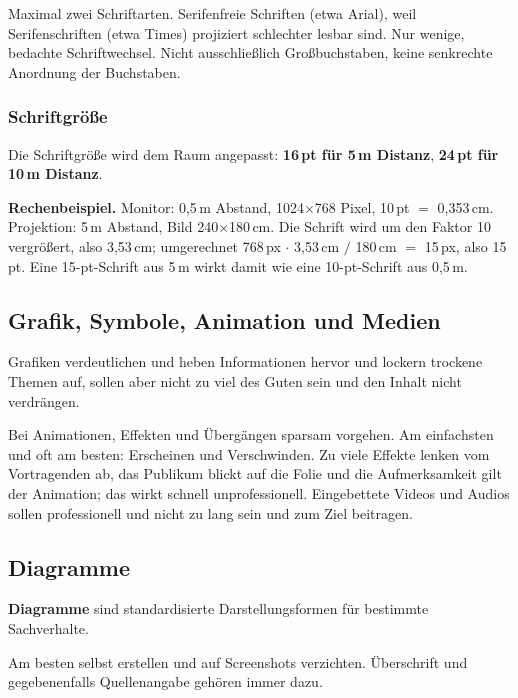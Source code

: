 \documentclass[12pt, a4paper]{article}
\begin{document}
Maximal zwei Schriftarten. Serifenfreie Schriften (etwa Arial), weil
Serifenschriften (etwa Times) projiziert schlechter lesbar sind. Nur wenige,
bedachte Schriftwechsel. Nicht ausschließlich Großbuchstaben, keine
senkrechte Anordnung der Buchstaben.

\subsubsection{Schriftgröße}

Die Schriftgröße wird dem Raum angepasst: \textbf{16\,pt für 5\,m Distanz},
\textbf{24\,pt für 10\,m Distanz}.

\begin{examplebox}
\textbf{Rechenbeispiel.} Monitor: 0,5\,m Abstand, 1024$\times$768 Pixel,
10\,pt $=$ 0,353\,cm. Projektion: 5\,m Abstand, Bild 240$\times$180\,cm. Die
Schrift wird um den Faktor 10 vergrößert, also 3,53\,cm; umgerechnet
768\,px $\cdot$ 3{,}53\,cm $/$ 180\,cm $=$ 15\,px, also 15\,pt. Eine
15-pt-Schrift aus 5\,m wirkt damit wie eine 10-pt-Schrift aus 0,5\,m.
\end{examplebox}

\subsection{Grafik, Symbole, Animation und Medien}

Grafiken verdeutlichen und heben Informationen hervor und lockern trockene
Themen auf, sollen aber nicht \glqq zu viel des Guten\grqq{} sein und den
Inhalt nicht verdrängen.

Bei Animationen, Effekten und Übergängen sparsam vorgehen. Am einfachsten und
oft am besten: Erscheinen und Verschwinden. Zu viele Effekte lenken vom
Vortragenden ab, das Publikum blickt auf die Folie und die Aufmerksamkeit
gilt der Animation; das wirkt schnell unprofessionell. Eingebettete Videos
und Audios sollen professionell und nicht zu lang sein und zum Ziel
beitragen.

\subsection{Diagramme}

\begin{definitionbox}
\textbf{Diagramme} sind standardisierte Darstellungsformen für bestimmte
Sachverhalte.
\end{definitionbox}

Am besten selbst erstellen und auf Screenshots verzichten. Überschrift und
gegebenenfalls Quellenangabe gehören immer dazu.
\end{document}
